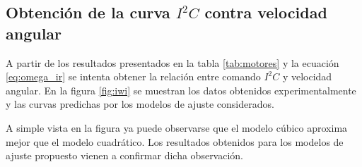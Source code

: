 \documentclass[main]{subfiles}
\begin{document}
\begin{figure}[H]
  \vspace{-20pt}
\hspace{-50pt}
  \vspace{-5pt}
  \caption{}  
  \vspace{-10pt}
\end{figure}

\subsection{Obtenci\'on de la curva $I^2C$ contra velocidad angular}

A partir de los resultados presentados en la tabla \ref{tab:motores} y la ecuaci\'on \ref{eq:omega_ir} se intenta obtener la relaci\'on entre comando $I^2C$ y velocidad angular. En la figura \ref{fig:iwi} se muestran los datos obtenidos experimentalmente y las curvas predichas por los modelos de ajuste considerados.

A simple vista en la figura ya puede observarse que el modelo c\'ubico aproxima mejor que el modelo cuadr\'atico.
Los resultados obtenidos para los modelos de ajuste propuesto vienen a confirmar dicha observaci\'on.
\end{document}
